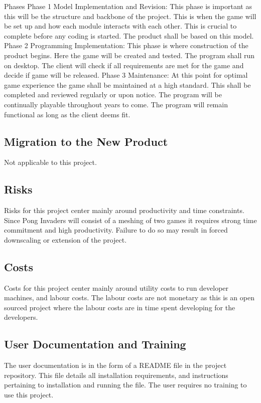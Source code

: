 \documentclass[12pt, titlepage]{article}
\begin{document}
Phases Phase 1 Model Implementation and Revision: This phase is important as this will be the structure and backbone of the project. This is when the game will be set up  and how each module interacts with each other. This is crucial to complete before any coding is started. The product shall be based on this model. Phase 2 Programming Implementation: This phase is where construction of the product begins. Here the game will be created and tested. The program shall run on desktop. The client will check if all requirements are met for the game and decide if game will be released. Phase 3 Maintenance: At this point for optimal game experience the game shall be maintained at a high standard. This shall be completed and reviewed regularly or upon notice. The program will be continually playable throughout years to come. The program will remain functional as long as the client deems fit. 


\subsection{Migration to the New Product}
Not applicable to this project.

\subsection{Risks}
Risks for this project center mainly around productivity and time constraints. Since Pong Invaders will consist of a meshing of two games it requires strong time commitment and high productivity. Failure to do so may result in forced downscaling or extension of the project. 

\subsection{Costs}
Costs for this project center mainly around utility costs to run developer machines, and labour costs. The labour costs are not monetary as this is an open sourced project where the labour costs are in time spent developing for the developers.

\subsection{User Documentation and Training}
The user documentation is in the form of a README file in the project repository. This file details all installation requirements, and instructions pertaining to installation and running the file. The user requires no training to use this project.
\end{document}

